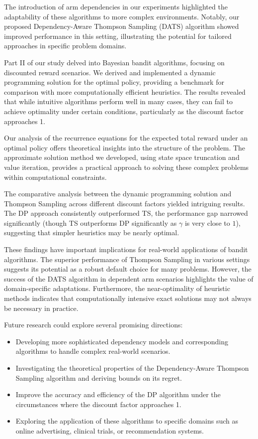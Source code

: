 \documentclass[11pt]{article}
\begin{document}
The introduction of arm dependencies in our experiments highlighted the adaptability of these algorithms to more complex environments. Notably, our proposed Dependency-Aware Thompson Sampling (DATS) algorithm showed improved performance in this setting, illustrating the potential for tailored approaches in specific problem domains.

Part II of our study delved into Bayesian bandit algorithms, focusing on discounted reward scenarios. We derived and implemented a dynamic programming solution for the optimal policy, providing a benchmark for comparison with more computationally efficient heuristics. The results revealed that while intuitive algorithms perform well in many cases, they can fail to achieve optimality under certain conditions, particularly as the discount factor approaches 1.

Our analysis of the recurrence equations for the expected total reward under an optimal policy offers theoretical insights into the structure of the problem. The approximate solution method we developed, using state space truncation and value iteration, provides a practical approach to solving these complex problems within computational constraints.

The comparative analysis between the dynamic programming solution and Thompson Sampling across different discount factors yielded intriguing results. The DP approach consistently outperformed TS, the performance gap narrowed significantly (though TS outperforms DP significantly as $\gamma$ is very close to $1$), suggesting that simpler heuristics may be nearly optimal.

These findings have important implications for real-world applications of bandit algorithms. The superior performance of Thompson Sampling in various settings suggests its potential as a robust default choice for many problems. However, the success of the DATS algorithm in dependent arm scenarios highlights the value of domain-specific adaptations. Furthermore, the near-optimality of heuristic methods indicates that computationally intensive exact solutions may not always be necessary in practice.

Future research could explore several promising directions:
\begin{itemize}
    \item Developing more sophisticated dependency models and corresponding algorithms to handle complex real-world scenarios.
    \item Investigating the theoretical properties of the Dependency-Aware Thompson Sampling algorithm and deriving bounds on its regret.
    \item Improve the accuracy and efficiency of the DP algorithm under the circumstances where the discount factor approaches 1.
    \item Exploring the application of these algorithms to specific domains such as online advertising, clinical trials, or recommendation systems.
\end{itemize}
\end{document}
